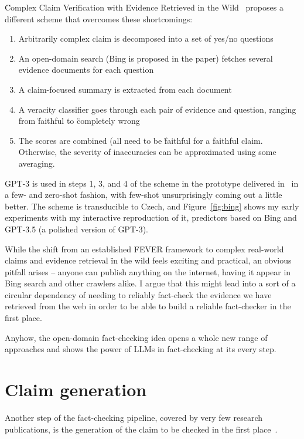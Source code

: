 \"{Complex Claim Verification with Evidence Retrieved in the Wild}~\cite{bing} proposes a different scheme that overcomes these shortcomings:

\begin{enumerate}
    \item Arbitrarily complex claim is decomposed into a set of yes/no questions
    \item An open-domain search (Bing is proposed in the paper) fetches several evidence documents for each question
    \item A claim-focused summary is extracted from each document
    \item A veracity classifier goes through each pair of evidence and question, ranging from \"{faithful} to \"{completely wrong}
    \item The scores are combined (all need to be \"{faithful} for a faithful claim. Otherwise, the severity of inaccuracies can be approximated using some averaging.
\end{enumerate}

GPT-3 is used in steps 1, 3, and 4 of the scheme in the prototype delivered in~\cite{bing} in a few- and zero-shot fashion, with few-shot unsurprisingly coming out a little better. The scheme is transducible to Czech, and Figure~\ref{fig:bing} shows my early experiments with my interactive reproduction of it, predictors based on Bing and GPT-3.5 (a polished version of GPT-3).

While the shift from an established FEVER framework to complex real-world claims and evidence retrieval \"{in the wild} feels exciting and practical, an obvious pitfall arises -- anyone can publish anything on the internet, having it appear in Bing search and other crawlers alike. I argue that this might lead into a sort of a circular dependency of needing to reliably fact-check the evidence we have retrieved from the web in order to be able to build a reliable fact-checker in the first place.

Anyhow, the open-domain fact-checking idea opens a whole new range of approaches and shows the power of LLMs in fact-checking at its every step.

\section{Claim generation}
Another step of the fact-checking pipeline, covered by very few research publications, is the generation of the claim to be checked in the first place~\cite{guo-etal-2022-survey}.

